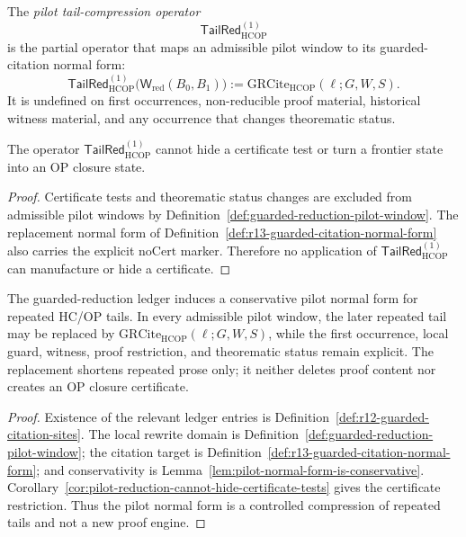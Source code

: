 \begin{definition}
\label{def:pilot-tail-compression-operator}
The \emph{pilot tail-compression operator}
\[
 \mathsf{TailRed}_{\mathrm{HCOP}}^{(1)}
\]
is the partial operator that maps an admissible pilot window to its guarded-citation normal form:
\[
 \mathsf{TailRed}_{\mathrm{HCOP}}^{(1)}
 \bigl(\mathsf W_{\mathrm{red}}(B_0,B_1)\bigr)
 :=
 \mathrm{GRCite}_{\mathrm{HCOP}}(\ell;G,W,S).
\]
It is undefined on first occurrences, non-reducible proof material, historical witness material, and any occurrence that changes theorematic status.
\end{definition}

\begin{corollary}
\label{cor:pilot-reduction-cannot-hide-certificate-tests}
The operator \(\mathsf{TailRed}_{\mathrm{HCOP}}^{(1)}\) cannot hide a certificate test or turn a frontier state into an OP closure state.
\end{corollary}

\begin{proof}
Certificate tests and theorematic status changes are excluded from admissible pilot windows by Definition~\ref{def:guarded-reduction-pilot-window}. The replacement normal form of Definition~\ref{def:r13-guarded-citation-normal-form} also carries the explicit \(\mathrm{noCert}\) marker. Therefore no application of \(\mathsf{TailRed}_{\mathrm{HCOP}}^{(1)}\) can manufacture or hide a certificate.
\end{proof}

\begin{theorem}
\label{thm:first-guarded-reduction-pilot-normal-form}
The guarded-reduction ledger induces a conservative pilot normal form for repeated HC/OP tails. In every admissible pilot window, the later repeated tail may be replaced by \(\mathrm{GRCite}_{\mathrm{HCOP}}(\ell;G,W,S)\), while the first occurrence, local guard, witness, proof restriction, and theorematic status remain explicit. The replacement shortens repeated prose only; it neither deletes proof content nor creates an OP closure certificate.
\end{theorem}

\begin{proof}
Existence of the relevant ledger entries is Definition~\ref{def:r12-guarded-citation-sites}. The local rewrite domain is Definition~\ref{def:guarded-reduction-pilot-window}; the citation target is Definition~\ref{def:r13-guarded-citation-normal-form}; and conservativity is Lemma~\ref{lem:pilot-normal-form-is-conservative}. Corollary~\ref{cor:pilot-reduction-cannot-hide-certificate-tests} gives the certificate restriction. Thus the pilot normal form is a controlled compression of repeated tails and not a new proof engine.
\end{proof}

